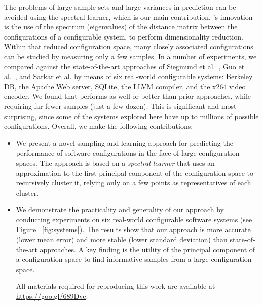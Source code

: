 The problems of large sample sets and large variances in prediction can be avoided using the \what spectral learner, which is our main contribution.  
{\what}'s innovation is  the use of the spectrum (eigenvalues) of the distance matrix
between the configurations of a configurable system, to perform dimensionality reduction. Within that
reduced configuration space, many closely associated configurations can be studied
by measuring only a few samples.
In a number of experiments, we compared \what against the state-of-the-art approaches of Siegmund et al.~\cite{siegmund2012predicting}, Guo et al.~\cite{guo2013variability}, and Sarkar et al. \cite{sarkar2015cost} by means of six real-world configurable systems: Berkeley DB,  the Apache Web server, SQLite, the LLVM compiler, and the x264 video encoder.
We found that \what performs as well or better than prior approaches,
while  requiring far fewer samples (just a few dozen).
This is significant and most surprising, since some of the systems explored here have up to millions of possible configurations. 
\newpage
Overall, we make the following contributions:
\begin{itemize}
\item We present a novel sampling and learning approach for predicting the performance of software configurations in the face of large configuration spaces. The approach is based on a
{\em spectral
learner} that uses an approximation to the first principal component of the configuration space to recursively cluster it, relying only on a few points as representatives of each cluster.
\item We demonstrate the practicality and generality of our approach by conducting experiments on six real-world configurable software systems (see Figure ~\ref{fig:systems}). The results show that our approach is more accurate (lower mean error) and more stable (lower standard deviation) than state-of-the-art approaches. A key finding is the utility of the principal component of a configuration space to  find informative samples from a large configuration space.

All materials required for reproducing this work are available at \url{https://goo.gl/689Dve}.
\end{itemize}

